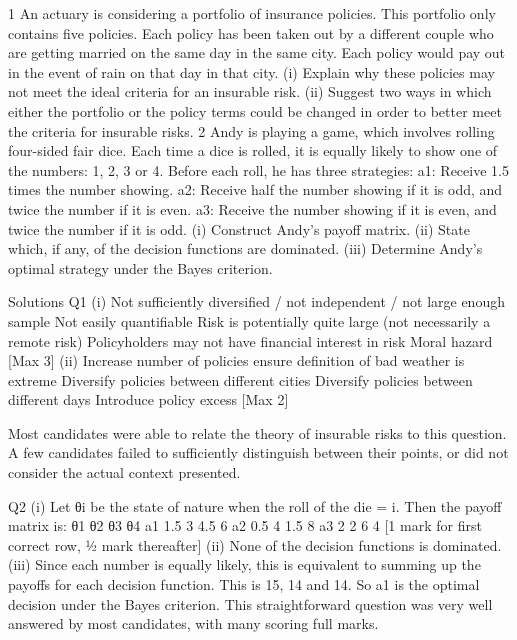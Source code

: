 \documentclass[a4paper,12pt]{article}
\begin{document}
1 An actuary is considering a portfolio of insurance policies. This portfolio only contains five policies. Each policy has been taken out by a different couple who are getting married on the same day in the same city. Each policy would pay out in the
event of rain on that day in that city.
(i) Explain why these policies may not meet the ideal criteria for an insurable risk. 
(ii) Suggest two ways in which either the portfolio or the policy terms could be changed in order to better meet the criteria for insurable risks. 
2 Andy is playing a game, which involves rolling four-sided fair dice. Each time a dice is rolled, it is equally likely to show one of the numbers: 1, 2, 3 or 4.
Before each roll, he has three strategies:
  a1: Receive 1.5 times the number showing.
a2: Receive half the number showing if it is odd, and twice the number if it is even.
a3: Receive the number showing if it is even, and twice the number if it is odd.
(i) Construct Andy’s payoff matrix. 
(ii) State which, if any, of the decision functions are dominated. 
(iii) Determine Andy’s optimal strategy under the Bayes criterion. 

\new%
Solutions
Q1 (i) Not sufficiently diversified / not independent / not large enough sample 
Not easily quantifiable 
Risk is potentially quite large (not necessarily a remote risk) 
Policyholders may not have financial interest in risk 
Moral hazard 
[Max 3]
(ii) Increase number of policies 
ensure definition of bad weather is extreme 
Diversify policies between different cities 
Diversify policies between different days 
Introduce policy excess 
[Max 2]

Most candidates were able to relate the theory of insurable risks to this question. A few candidates failed to sufficiently distinguish between their points, or did not consider the actual context presented.

Q2 (i) Let θi be the state of nature when the roll of the die = i.
Then the payoff matrix is:
  θ1 θ2 θ3 θ4
a1 1.5 3 4.5 6
a2 0.5 4 1.5 8
a3 2 2 6 4
[1 mark for first correct row, ½ mark thereafter]
(ii) None of the decision functions is dominated. 
(iii) Since each number is equally likely, this is equivalent to summing up the payoffs for each decision function. 
This is 15, 14 and 14. 
So a1 is the optimal decision under the Bayes criterion. 
This straightforward question was very well answered by most candidates, with many scoring full marks.
\end{document}
